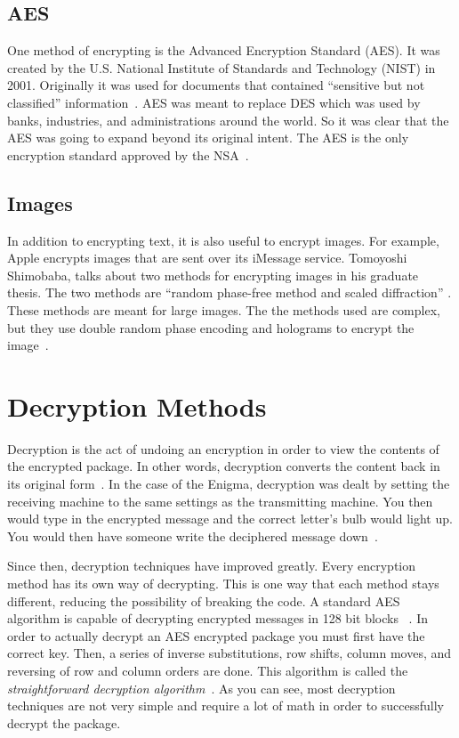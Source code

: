 \documentclass[12pt,a4paper,titlepage]{article}
\begin{document}
\subsection{AES}
One method of encrypting is the Advanced Encryption Standard (AES)\@. It was 
created by the U.S. National Institute of Standards and Technology (NIST) in 
2001. Originally it was used for documents that contained ``sensitive but not 
classified'' information~\cite{daemen2013design}. AES was meant to replace DES 
which was used by banks, industries, and administrations around the world. So it
was clear that the AES was going to expand beyond its original intent. The AES 
is the only encryption standard approved by the NSA~\cite{daemen2013design}.

\subsection{Images}
In addition to encrypting text, it is also useful to encrypt images. For example,
Apple encrypts images that are sent over its iMessage service. Tomoyoshi
Shimobaba, talks about two methods for encrypting images in his graduate thesis.
The two methods are ``random phase-free method and scaled diffraction'' 
\cite{shimobaba2015optical}. These methods are meant for large images. The
the methods used are complex, but they use double random phase encoding and 
holograms to encrypt the image~\cite{shimobaba2015optical}.

\section{Decryption Methods}
Decryption is the act of undoing an encryption in order to view the contents of
the encrypted package. In other words, decryption converts the content back in
its original form~\cite{deshpande2009fpga}. In the case of the Enigma,
decryption was dealt by setting the receiving machine to the same settings as
the transmitting machine. You then would type in the encrypted message and the
correct letter's bulb would light up. You would then have someone write the
deciphered message down~\cite{wilcox2006solving}.

Since then, decryption techniques have improved greatly. Every encryption
method has its own way of decrypting. This is one way that each method stays
different, reducing the possibility of breaking the code. A standard AES
algorithm is capable of decrypting encrypted messages in 128 bit blocks
~\cite{deshpande2009fpga}. In order to actually decrypt an AES encrypted package
you must first have the correct key. Then, a series of inverse substitutions,
row shifts, column moves, and reversing of row and column orders are done. This
algorithm is called the
\emph{straightforward decryption algorithm}~\cite{daemen2013design}. As you can
see, most decryption techniques are not very simple and require a lot of math
in order to successfully decrypt the package.
\end{document}
